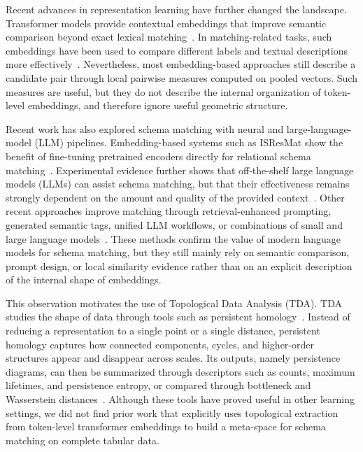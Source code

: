 \documentclass[sigconf, nonacm]{acmart}
\begin{document}
Recent advances in representation learning have further changed the landscape. Transformer models provide contextual embeddings that improve semantic comparison beyond exact lexical matching~\cite{devlin2019bert}. In matching-related tasks, such embeddings have been used to compare different labels and textual descriptions more effectively~\cite{he2022bertmap}. Nevertheless, most embedding-based approaches still describe a candidate pair through local pairwise measures computed on pooled vectors. Such measures are useful, but they do not describe the internal organization of token-level embeddings, and therefore ignore useful geometric structure.

Recent work has also explored schema matching with neural and large-language-model (LLM) pipelines. Embedding-based systems such as ISResMat show the benefit of fine-tuning pretrained encoders directly for relational schema matching~\cite{du2024isresmat}. Experimental evidence further shows that off-the-shelf large language models (LLMs) can assist schema matching, but that their effectiveness remains strongly dependent on the amount and quality of the provided context~\cite{parciak2024schema}. Other recent approaches improve matching through retrieval-enhanced prompting, generated semantic tags, unified LLM workflows, or combinations of small and large language models~\cite{sheetrit2024rematch,zhang2024smutf,liu2024magneto,wang2025llmatch}. These methods confirm the value of modern language models for schema matching, but they still mainly rely on semantic comparison, prompt design, or local similarity evidence rather than on an explicit description of the internal shape of embeddings.

This observation motivates the use of Topological Data Analysis (TDA). TDA studies the shape of data through tools such as persistent homology~\cite{edelsbrunner2002topological,zomorodian2005computing,chazal2021tda}. Instead of reducing a representation to a single point or a single distance, persistent homology captures how connected components, cycles, and higher-order structures appear and disappear across scales. Its outputs, namely persistence diagrams, can then be summarized through descriptors such as counts, maximum lifetimes, and persistence entropy, or compared through bottleneck and Wasserstein distances~\cite{cohen2007stability,chintakunta2015entropy,merelli2015topological}. Although these tools have proved useful in other learning settings, we did not find prior work that explicitly uses topological extraction from token-level transformer embeddings to build a meta-space for schema matching on complete tabular data.
\end{document}
